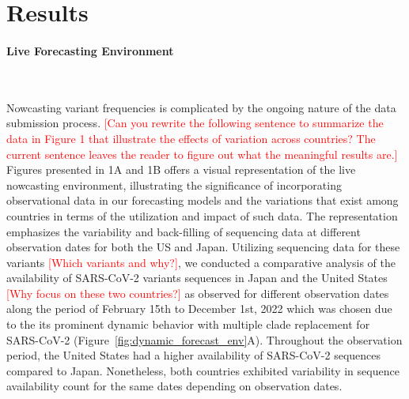 \documentclass[11pt,oneside,letterpaper]{article}
\def\jhc#1{\textcolor{red}{[#1]}}
\begin{document}
\section*{Results}


\paragraph{Live Forecasting Environment}\

Nowcasting variant frequencies is complicated by the ongoing nature of the data submission process.
\jhc{Can you rewrite the following sentence to summarize the data in Figure 1 that illustrate the effects of variation across countries? The current sentence leaves the reader to figure out what the meaningful results are.}
Figures presented in 1A and 1B offers a visual representation of the live nowcasting environment, illustrating the significance of incorporating observational data in our forecasting models and the variations that exist among countries in terms of the utilization and impact of such data.
The representation emphasizes the variability and back-filling of sequencing data at different observation dates for both the US and Japan. 
Utilizing sequencing data for these variants \jhc{Which variants and why?}, we conducted a comparative analysis of the availability of SARS-CoV-2 variants sequences in Japan and the United States \jhc{Why focus on these two countries?} as observed for different observation dates along the period of February 15th to December 1st, 2022 which was chosen due to the its prominent dynamic behavior with multiple clade replacement for SARS-CoV-2 \cite{:ck_markov_covid}  (Figure~\ref{fig:dynamic_forecast_env}A).
Throughout the observation period, the United States had a higher availability of SARS-CoV-2 sequences compared to Japan.
Nonetheless, both countries exhibited variability in sequence availability count for the same dates depending on observation dates. 
\end{document}
